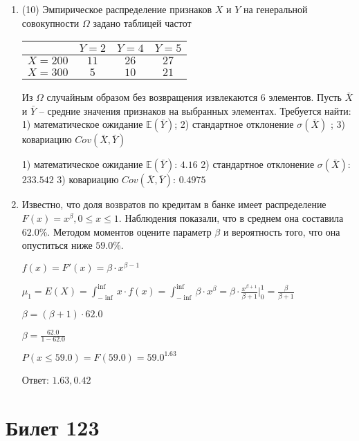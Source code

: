 \documentclass[a4paper,12pt]{article}
\begin{document}
\begin{enumerate}
    

\item


(10) Эмпирическое распределение признаков $X$ и $Y$ на генеральной совокупности $\Omega$ задано таблицей частот  
 
\begin{tabular}{ | c | c | c | c | }
\hline
 & $Y = 2$ & $Y = 4$ & $Y = 5$  \\ \hline
$X = 200$ & $11$ & $26$ & $27$\\ \hline
$X = 300$ & $5$ & $10$ & $21$\\
\hline
\end{tabular}

Из $\Omega$ случайным образом без возвращения извлекаются $6$ элементов. 
Пусть $\bar X$ и $\bar Y$ – средние значения признаков на выбранных элементах. 
Требуется найти: 1) математическое ожидание $\mathbb{E}(\bar Y)$; 2) стандартное отклонение $\sigma(\bar X)$ ; 
3) ковариацию $Cov(\bar X, \bar Y)$




1) математическое ожидание $\mathbb{E}(\bar Y)$: $4.16$ 
2) стандартное отклонение $\sigma(\bar X)$: $233.542$
3) ковариацию $Cov(\bar X, \bar Y)$: $0.4975$


\item

    
	Известно, что доля возвратов по кредитам в банке имеет распределение $F(x) = x^{\beta}, 0 \le x \le 1$. Наблюдения показали, что в среднем она составила $62.0$\%. Методом моментов оцените параметр $\beta$ и вероятность того, что она опуститься ниже $59.0$\%.
	


	

	$f(x) = F'(x) = \beta \cdot x^{\beta - 1}$

	$\mu_{1} = E(X) = \int_{-\inf}^{\inf}x \cdot f(x) = \int_{-\inf}^{\inf} \beta \cdot x^{\beta} = \beta \cdot \frac{x^{\beta + 1}}{\beta + 1}\bigg|_0^1 = \frac{\beta}{\beta + 1}$

	$\beta = (\beta + 1) \cdot 62.0$

	$\beta = \frac{62.0}{1 - 62.0}$

	$ P(x \le 59.0) = F(59.0) = 59.0^{1.63} $

    Ответ: $1.63, 0.42$
	


\end{enumerate}

\section{Билет 123}
\end{document}
